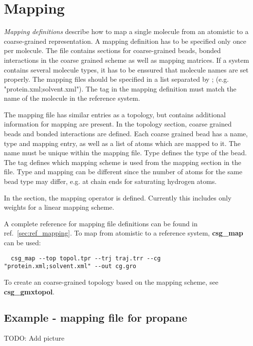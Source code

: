 \section{Mapping}
\label{sec:mapping}
{\em Mapping definitions} describe how to map a single molecule from an atomistic to a coarse-grained representation. A mapping definition has to be specified only once per molecule. The file contains sections for coarse-grained beads, bonded interactions in the coarse grained scheme as well as mapping matrices. If a system contains several molecule types, it has to be enssured that molecule names are set properly. The mapping files should be specified in a list separated by ; (e.g. "protein.xml;solvent.xml"). The  tag in the mapping definition must match the name of the molecule in the reference system.

The mapping file has similar entries as a topology, but contains additional information for mapping are present. In the topology section, coarse grained beads and bonded interactions are defined. Each coarse grained bead has a name, type and mapping entry, as well as a list of atoms which are mapped to it. The name must be unique within the mapping file. Type defines the type of the bead. The  tag defines which mapping scheme is used from the mapping section in the file. Type and mapping can be different since the number of atoms for the same bead type may differ, e.g. at chain ends for saturating hydrogen atoms.

In the  section, the mapping operator is defined. Currently this includes only weights for a linear mapping scheme.

A complete reference for mapping file definitions can be found in ref.~\ref{sec:ref_mapping}. To map from atomistic to a reference system, \textbf{csg\_map} can be used:
\begin{verbatim}
  csg_map --top topol.tpr --trj traj.trr --cg "protein.xml;solvent.xml" --out cg.gro
\end{verbatim}

To create an coarse-grained topology based on the mapping scheme, see \textbf{csg\_gmxtopol}.

\subsection{Example - mapping file for propane}
TODO: Add picture


